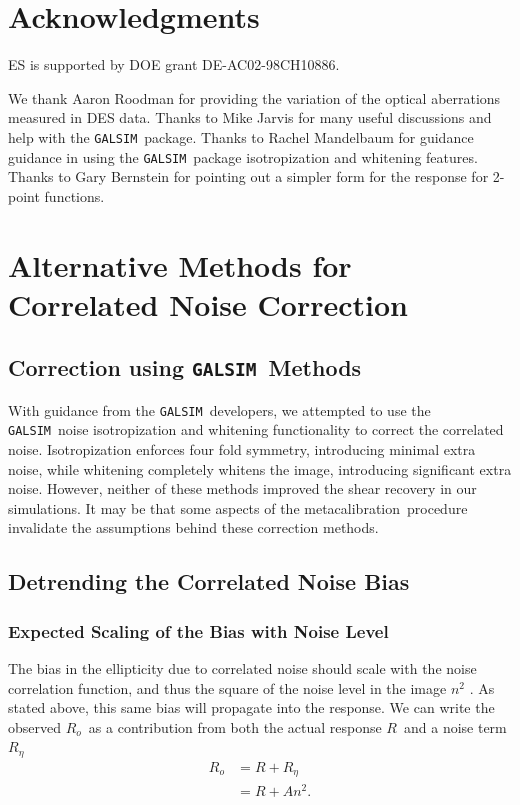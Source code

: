\documentclass[a4paper,fleqn,usenatbib]{mnras}
\newcommand{\mcal}{metacalibration}
\newcommand{\mcalR}{$R$}
\newcommand{\mcalRo}{$R_o$}
\newcommand{\mcalRnoise}{$R_\eta$}
\newcommand{\galsim}{\texttt{GALSIM}}
\begin{document}
\section*{Acknowledgments}

ES is supported by DOE grant DE-AC02-98CH10886.

We thank Aaron Roodman for providing the variation of the optical aberrations
measured in DES data.  Thanks to Mike Jarvis for many useful discussions and
help with the \galsim\ package.  Thanks to Rachel Mandelbaum for guidance
guidance in using the \galsim\ package isotropization and whitening features.
Thanks to Gary Bernstein for pointing out a simpler form for the response for
2-point functions.


\appendix

\section{Alternative Methods for Correlated Noise Correction} \label{sec:altcorr}

\subsection{Correction using \galsim\ Methods}

With guidance from the \galsim\ developers, we attempted to use the \galsim\
noise isotropization and whitening functionality to correct the correlated
noise.  Isotropization enforces four fold symmetry, introducing minimal extra
noise, while whitening completely whitens the image, introducing significant
extra noise.  However, neither of these methods improved the shear recovery in
our simulations.  It may be that some aspects of the \mcal\ procedure
invalidate the assumptions behind these correction methods.


\subsection{Detrending the Correlated Noise Bias} \label{sec:detrend}

\subsubsection{Expected Scaling of the Bias with Noise Level} \label{sec:scaling}

The bias in the ellipticity due to correlated noise should scale
with the noise correlation function, and thus the square of the noise level in
the image $n^2$ \citep{Kaiser2000,HirataCorrNoise}.  As stated above, this same bias will
propagate into the response.  We can write the observed \mcalRo\ as a contribution
from both the actual response \mcalR\ and a noise term \mcalRnoise\
\begin{align} \label{eq:scaling}
    \mbox{\mcalRo} &= R + \mbox{\mcalRnoise}  \nonumber \\
                   &= R + A n^2.
\end{align}
\end{document}
